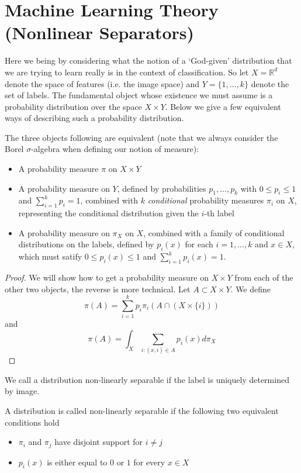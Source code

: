 \section{Machine Learning Theory (Nonlinear Separators)}
Here we being by considering what the notion of a `God-given' distribution that we are trying to learn really is in the context of classification. So let $X = \mathbb{R}^d$ denote the space of features (i.e. the image space) and $Y = \{1,...,k\}$ denote the set of labels. The fundamental object whose existence we must assume is a probability distribution over the space $X\times Y$. Below we give a few equivalent ways of describing such a probability distribution.

\begin{lemma}
 The three objects following are equivalent (note that we always consider the Borel $\sigma$-algebra when defining our notion of measure):
 \begin{itemize}
  \item A probability measure $\pi$ on $X\times Y$
  \item A probability measure on $Y$, defined by probabilities $p_1,...,p_k$ with $0\leq p_i\leq 1$ and $\sum_{i=1}^k p_i = 1$, combined with $k$ \textit{conditional} probability measures $\pi_i$ on $X$, representing the conditional distribution given the $i$-th label
  \item A probability measure on $\pi_X$ on $X$, combined with a family of conditional distributions on the labels, defined by $p_i(x)$ for each $i = 1,...,k$ and $x\in X$, which must satify $0\leq p_i(x)\leq 1$ and $\sum_{i=1}^k p_i(x) = 1$.
 \end{itemize}

\end{lemma}

\begin{proof}
 We will show how to get a probability measure on $X\times Y$ from each of the other two objects, the reverse is more technical. Let $A\subset X\times Y$. We define
 \begin{equation}
  \pi(A) = \sum_{i=1}^k p_i\pi_i(A\cap (X\times \{i\}))
 \end{equation}
 and
 \begin{equation}
  \pi(A) = \int_X \sum_{i:(x,i)\in A} p_i(x)d\pi_X
 \end{equation}

\end{proof}

We call a distribution non-linearly separable if the label is uniquely determined by image.
\begin{definition}
 A distribution is called non-linearly separable if the following two equivalent conditions hold
 \begin{itemize}
  \item $\pi_i$ and $\pi_j$ have disjoint support for $i\neq j$
  \item $p_i(x)$ is either equal to $0$ or $1$ for every $x\in X$
 \end{itemize}

\end{definition}

